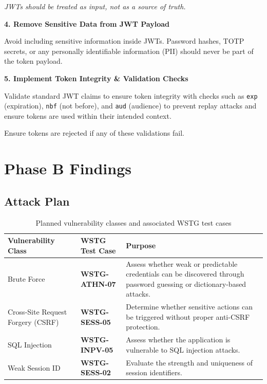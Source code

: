 \documentclass[11pt,a4paper]{report}
\begin{document}
\begin{tcolorbox}[colback=lightgray,colframe=headerblack,title=\textbf{Recommended Fixes}]
        \textit{JWTs should be treated as input, not as a source of truth.}

        \vspace{0.3cm}

        \textbf{4. Remove Sensitive Data from JWT Payload}

        Avoid including sensitive information inside JWTs. Password hashes, TOTP secrets, or any personally identifiable information (PII) should never be part of the token payload.

        \vspace{0.2cm}

\textbf{5. Implement Token Integrity \& Validation Checks}

Validate standard JWT claims to ensure token integrity with checks such as \texttt{exp} (expiration), \texttt{nbf} (not before), and \texttt{aud} (audience) to prevent replay attacks and ensure tokens are used within their intended context.

Ensure tokens are rejected if any of these validations fail.
        \end{tcolorbox}
        

    \chapter{Phase B Findings}

    \section{Attack Plan}
    \label{sec:attack-plan}

    \begin{table}[H]
    \centering
    \begin{tabular}{|p{4cm}|p{4cm}|p{6cm}|}
    \hline
    \textbf{Vulnerability Class} & \textbf{WSTG Test Case} & \textbf{Purpose} \\
    \hline
    Brute Force & \textbf{WSTG-ATHN-07} & Assess whether weak or predictable credentials can be discovered through password guessing or dictionary-based attacks. \\
    \hline
    Cross-Site Request Forgery (CSRF) & \textbf{WSTG-SESS-05} & Determine whether sensitive actions can be triggered without proper anti-CSRF protection. \\
    \hline
    SQL Injection & \textbf{WSTG-INPV-05} & Assess whether the application is vulnerable to SQL injection attacks. \\
    \hline
    Weak Session ID & \textbf{WSTG-SESS-02} & Evaluate the strength and uniqueness of session identifiers. \\
    \end{tabular}
    \caption{Planned vulnerability classes and associated WSTG test cases}
    \label{tab:wstg-plan}
    \end{table}
\end{document}
